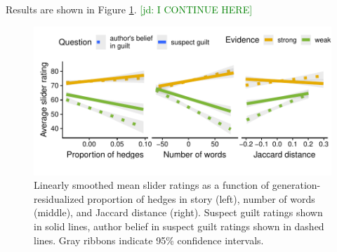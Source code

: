 \documentclass[10pt,letterpaper]{article}
\newcommand{\jd}[1]{\textcolor{Green}{[jd: #1]}}
\begin{document}
Results are shown in Figure \ref{fig:lingmarkers}.
 \jd{I CONTINUE HERE}
\begin{figure}[]
	\includegraphics[width=.5\textwidth]{pics/lingmarkers_resid}
	\caption{Linearly smoothed mean slider ratings as a function of generation-residualized proportion of hedges in story (left), number of words (middle), and Jaccard distance (right). Suspect guilt ratings shown in solid lines, author belief in suspect guilt ratings shown in dashed lines. Gray ribbons indicate 95\% confidence intervals.} 
	\label{fig:lingmarkers}
\end{figure}
\end{document}

